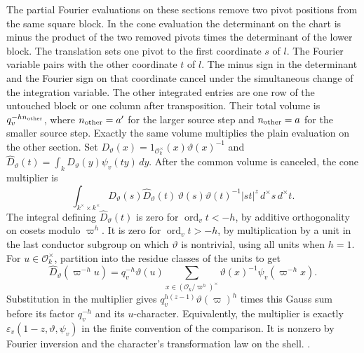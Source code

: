 The partial Fourier evaluations on these sections remove two pivot
positions from the same square block. In the cone evaluation the
determinant on the chart is minus the product of the two removed
pivots times the determinant of the lower block. The translation
sets one pivot to the first coordinate \(s\) of \(l\). The
Fourier variable pairs with the other coordinate \(t\) of \(l\).
The minus sign in the determinant and the Fourier sign on that
coordinate cancel under the simultaneous change of the integration
variable. The other integrated entries are one row of the untouched
block or one column after transposition. Their total volume is
\(q_v^{-hn_{\rm other}}\), where \(n_{\rm other}=a'\) for the larger
source step and \(n_{\rm other}=a\) for the smaller source step.
Exactly the same volume multiplies the plain evaluation on the
other section. Set \(D_\vartheta(x)=1_{\mathcal O_k^\times}(x)
\vartheta(x)^{-1}\) and
\(\widehat D_\vartheta(t)=\int_k D_\vartheta(y)\psi_v(ty)\,dy\).
After the common volume is canceled, the cone multiplier is
\[
 \int_{k^\times\times k^\times}
  D_\vartheta(s)\widehat D_\vartheta(t)\,
  \vartheta(s)\vartheta(t)^{-1}|st|^z\,d^\times s\,d^\times t.
\]
The integral defining \(\widehat D_\vartheta(t)\) is zero for
\(\operatorname{ord}_v t<-h\), by additive orthogonality on cosets
modulo \(\varpi^h\). It is zero for \(\operatorname{ord}_v t>-h\),
by multiplication by a unit in the last conductor subgroup on which
\(\vartheta\) is nontrivial, using all units when \(h=1\).
For \(u\in\mathcal O_k^\times\), partition into the residue classes of
the units to get
\[
 \widehat D_\vartheta(\varpi^{-h}u)=q_v^{-h}\vartheta(u)
   \sum_{x\in(\mathcal O_k/\varpi^h)^\times}
   \vartheta(x)^{-1}\psi_v(\varpi^{-h}x).
\]
Substitution in the multiplier gives
\(q_v^{h(z-1)}\vartheta(\varpi)^h\) times this Gauss sum before its
factor \(q_v^{-h}\) and its \(u\)-character. Equivalently, the
multiplier is exactly \(\varepsilon_v(1-z,\vartheta,\psi_v)\) in the
finite convention of the comparison. It is nonzero by Fourier
inversion and the character's transformation law on the shell.
.

